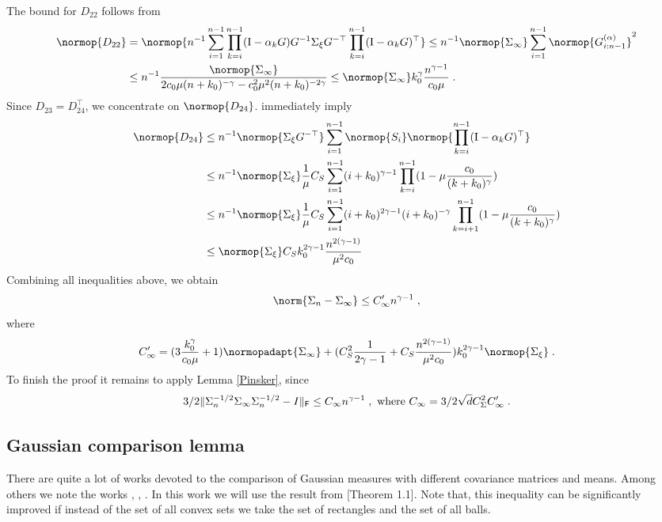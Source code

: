     The bound for $D_{22}$ follows from  
    \begin{align} 
        \label{lemma:D22_bound}
        \normop{D_{22}} &= \normop{n^{-1}\sum_{i=1}^{n-1} \prod_{k=i}^{n-1} (\Id - \alpha_k G) G^{-1} \noisecov G^{-\top} \prod_{k=i}^{n-1} (\Id - \alpha_k G)^\top} \leq n^{-1} \normop{\Sigma_\infty} \sum_{i=1}^{n-1} \normop{G_{i:n-1}^{(\alpha)}}^2 \\ 
        &\leq 
        n^{-1} \frac{\normop{\Sigma_\infty}}{ 2c_0\mu(n+k_0)^{-\gamma} - c_0^2\mu^2(n+k_0)^{-2\gamma}} \leq 
         \normop{\Sigma_\infty} k_0^{\gamma}\frac{n^{\gamma-1}}{c_0\mu}\eqsp.
    \end{align}
    Since $D_{23} = D_{24}^\top$, we concentrate on $\normop{D_{24}}$.  immediately imply 
    \begin{align}
        \normop{D_{24}} & \leq n^{-1} \normop{\noisecov G^{-\top}} \sum_{i=1}^{n-1} \normop{S_i} \normop{\prod_{k=i}^{n-1} (\Id - \alpha_k G)^{\top}} \\ &\leq n^{-1} \normop{\noisecov}\frac{1}{\mu}C_{S}\sum_{i=1}^{n-1}(i+k_0)^{\gamma-1}\prod_{k=i}^{n-1}(1-\mu\frac{c_0}{(k+k_0)^\gamma}) \\ &\leq n^{-1} \normop{\noisecov}\frac{1}{\mu}C_{S}\sum_{i=1}^{n-1}(i+k_0)^{2\gamma-1}(i+k_0)^{-\gamma}\prod_{k=i+1}^{n-1}(1-\mu\frac{c_0}{(k+k_0)^\gamma})\\ &\leq \normop{\noisecov}C_{S}k_0^{2\gamma-1}\frac{n^{2(\gamma-1)}}{\mu^2c_0}
    \end{align}
    Combining all inequalities above, we obtain
    \begin{equation}
        \norm{\Sigma_n-\Sigma_{\infty}} \leq C_{\infty}'n^{\gamma-1}\eqsp,
    \end{equation}
    where
    \begin{equation}
    \label{eq:def_C_infty_prime}
        C_{\infty}' = (3\frac{k_0^{\gamma}}{c_0\mu} +1)\normopadapt{\Sigma_{\infty}} +  (C_{S}^2 \frac{1}{2\gamma-1}+
        C_{S}\frac{n^{2(\gamma-1)}}{\mu^2c_0})k_0^{2\gamma-1}\normop{\noisecov}\eqsp.
    \end{equation}
To finish the proof it remains to apply Lemma \ref{Pinsker}, since
\begin{equation}
\label{eq:def_C_infty}
3/2\|\Sigma_n^{-1/2}\Sigma_{\infty}\Sigma_n^{-1/2}-I\|_{\mathsf{F}}\leq C_{\infty}n^{\gamma-1}\;, \text{ where } C_{\infty}=3/2 \sqrt{d} C_\Sigma^2 C_{\infty}'\;.
\end{equation}

\subsection{Gaussian comparison lemma}
There are quite a lot of works devoted to the comparison of Gaussian measures with different covariance matrices and means. Among others we note the works \cite{BarUly86}, \cite{Bernolli2019}, \cite{Devroye2018}. In this work we will use the result from \cite{Devroye2018}[Theorem 1.1]. Note that, this inequality can be significantly improved if instead of the set of all convex sets we take the set of rectangles and the set of all balls.

